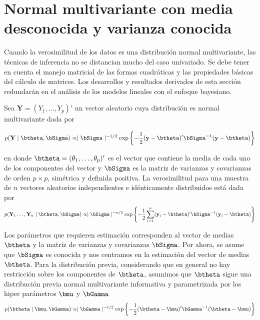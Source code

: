 \section{Normal multivariante con media desconocida y varianza conocida}

Cuando la verosimilitud de los datos es una distribución normal multivariante, las técnicas de inferencia no se distancian mucho del caso univariado. Se debe tener en cuenta el manejo matricial de las formas cuadráticas y las propiedades básicas del cálculo de matrices. Los desarrollos y resultados derivados de esta sección redundarán en el análisis de los modelos lineales con el enfoque bayesiano.

Sea $\mathbf{Y}=(Y_1,\ldots,Y_p)'$ un vector aleatorio cuya distribución es normal multivariante dada por

\begin{equation}
p(\mathbf{Y} \mid \btheta,\bSigma)\propto \mid \bSigma \mid ^{-1/2}
\exp\left\{-\frac{1}{2}(\mathbf{y}-\btheta)'\bSigma^{-1}(\mathbf{y}-\btheta)\right\}
  \end{equation}
  
en donde $\btheta=(\theta_1,\ldots,\theta_p)'$ es el vector que contiene la media de cada uno de los componentes del vector y $\bSigma$ es la matriz de varianzas y covarianzas de orden $p\times p$, simétrica y definida positiva. La verosimilitud para una muestra de $n$ vectores aleatorios  independientes e idénticamente distribuidos está dada por
\begin{equation*}\label{Vero_Multi}
  p(\mathbf{Y}_1\ldots,\mathbf{Y}_n \mid \btheta,\bSigma)\propto \mid \bSigma \mid ^{-n/2}
  \exp\left\{-\frac{1}{2}\sum_{i=1}^n(\mathbf{y}_i-\btheta)'\bSigma^{-1}(\mathbf{y}_i-\btheta)\right\}
\end{equation*}
    
Los parámetros que requieren estimación corresponden al vector de medias $\btheta$ y la matriz de varianzas y covarianzas $\bSigma$. Por ahora, se asume que $\bSigma$ es conocida y nos centramos en la estimación del vector de medias $\btheta$. Para la distribución previa, considerando que en general no hay restricción sobre los componentes de $\btheta$, asumimos que $\btheta$ sigue una distribución previa normal multivariante informativa y parametrizada por los hiper parámetros $\bmu$ y $\bGamma$
  \begin{equation*}
p(\btheta \mid \bmu,\bGamma)\propto \mid \bGamma \mid ^{-1/2}
\exp\left\{-\frac{1}{2}(\btheta-\bmu)'\bGamma^{-1}(\btheta-\bmu)\right\}
  \end{equation*}
    
